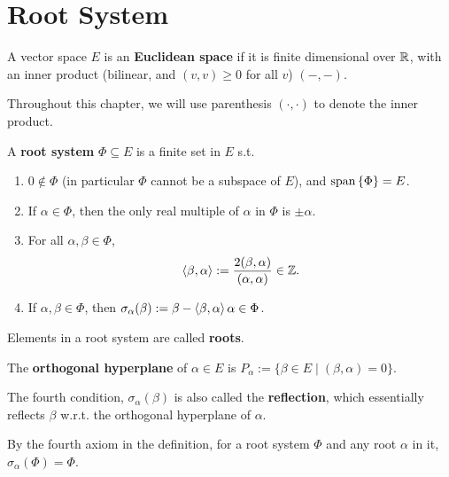 \documentclass{article}
\begin{document}

\tableofcontents  
\clearpage

\section{Root System}

\begin{definition}
    A vector space $E$ is an \textbf{Euclidean space} if it is finite dimensional over $\mathbb{R}$, with an inner product (bilinear, and $(v, v) \geq 0$ for all $v$) $(-, -)$.
\end{definition}
\nogap
\begin{notation}
    Throughout this chapter, we will use parenthesis $(\cdot, \cdot)$ to denote the inner product.
\end{notation}

\begin{definition}
    A \textbf{root system} $\Phi \subseteq E$ is a finite set in $E$ s.t.
    \begin{enumerate}
        \item $0 \notin \Phi$ (in particular $\Phi$ cannot be a subspace of $E$), and $\operatorname{span}\left\{ \Phi \right\} = E$.
        \item If $\alpha \in \Phi$, then the only real multiple of $\alpha$ in $\Phi$ is $\pm \alpha$.
        \item For all $\alpha, \beta \in \Phi$, 
        \[
            \left\langle \beta, \alpha \right\rangle := \frac{2(\beta, \alpha)}{(\alpha, \alpha)} \in \mathbb{Z}.
        \]
        \item If $\alpha, \beta \in \Phi$, then $\sigma_{\alpha}(\beta) := \beta - \left\langle \beta, \alpha \right\rangle\alpha \in \Phi$.
    \end{enumerate}
    Elements in a root system are called \textbf{roots}.
\end{definition}

\begin{definition}
    The \textbf{orthogonal hyperplane} of $\alpha \in E$ is $P_{\alpha} := \{ \beta \in E \mid (\beta, \alpha) = 0 \}$.
\end{definition}
\nogap
\begin{definition}[Reflection]
    The fourth condition, $\sigma_{\alpha}(\beta)$ is also called the \textbf{reflection}, which essentially reflects $\beta$ w.r.t. the orthogonal hyperplane of $\alpha$.
\end{definition}
\nogap
\begin{remark}
    By the fourth axiom in the definition, for a root system $\Phi$ and any root $\alpha$ in it, $\sigma_{\alpha}(\Phi) = \Phi$.
\end{remark}
\end{document}
